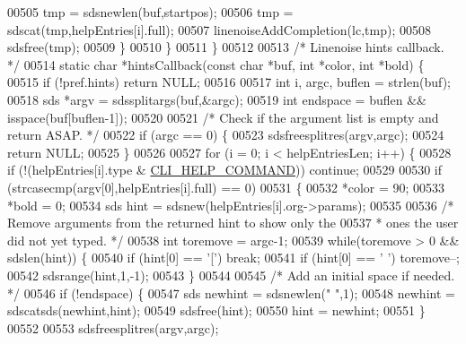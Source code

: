 \begin{DoxyCode}
{{{{{{{{{{{{00505             tmp = sdsnewlen(buf,startpos);
00506             tmp = sdscat(tmp,helpEntries[i].full);
00507             linenoiseAddCompletion(lc,tmp);
00508             sdsfree(tmp);
00509         \}
00510     \}
00511 \}
00512 
00513 \textcolor{comment}{/* Linenoise hints callback. */}
00514 \textcolor{keyword}{static} \textcolor{keywordtype}{char} *hintsCallback(\textcolor{keyword}{const} \textcolor{keywordtype}{char} *buf, \textcolor{keywordtype}{int} *color, \textcolor{keywordtype}{int} *bold) \{
00515     \textcolor{keywordflow}{if} (!pref.hints) \textcolor{keywordflow}{return} NULL;
00516 
00517     \textcolor{keywordtype}{int} i, argc, buflen = strlen(buf);
00518     sds *argv = sdssplitargs(buf,&argc);
00519     \textcolor{keywordtype}{int} endspace = buflen && isspace(buf[buflen-1]);
00520 
00521     \textcolor{comment}{/* Check if the argument list is empty and return ASAP. */}
00522     \textcolor{keywordflow}{if} (argc == 0) \{
00523         sdsfreesplitres(argv,argc);
00524         \textcolor{keywordflow}{return} NULL;
00525     \}
00526 
00527     \textcolor{keywordflow}{for} (i = 0; i < helpEntriesLen; i++) \{
00528         \textcolor{keywordflow}{if} (!(helpEntries[i].type & \hyperlink{redis-cli_8c_ad5a18b7d635c6438f512f3c5d7f9f546}{CLI\_HELP\_COMMAND})) \textcolor{keywordflow}{continue};
00529 
00530         \textcolor{keywordflow}{if} (strcasecmp(argv[0],helpEntries[i].full) == 0)
00531         \{
00532             *color = 90;
00533             *bold = 0;
00534             sds hint = sdsnew(helpEntries[i].org->params);
00535 
00536             \textcolor{comment}{/* Remove arguments from the returned hint to show only the}
00537 \textcolor{comment}{             * ones the user did not yet typed. */}
00538             \textcolor{keywordtype}{int} toremove = argc-1;
00539             \textcolor{keywordflow}{while}(toremove > 0 && sdslen(hint)) \{
00540                 \textcolor{keywordflow}{if} (hint[0] == \textcolor{stringliteral}{'['}) \textcolor{keywordflow}{break};
00541                 \textcolor{keywordflow}{if} (hint[0] == \textcolor{stringliteral}{' '}) toremove--;
00542                 sdsrange(hint,1,-1);
00543             \}
00544 
00545             \textcolor{comment}{/* Add an initial space if needed. */}
00546             \textcolor{keywordflow}{if} (!endspace) \{
00547                 sds newhint = sdsnewlen(\textcolor{stringliteral}{" "},1);
00548                 newhint = sdscatsds(newhint,hint);
00549                 sdsfree(hint);
00550                 hint = newhint;
00551             \}
00552 
00553             sdsfreesplitres(argv,argc);
}}}}}}}}}}}}
\end{DoxyCode}
